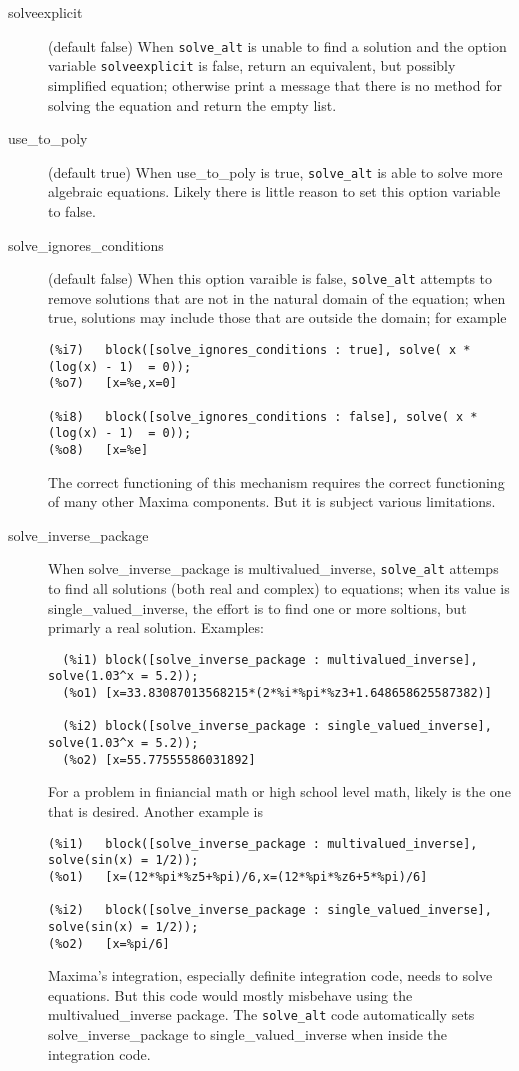 \documentclass[]{article}%
\newcommand{\altsolve}{\texttt{solve\_alt}}
\newcommand{\solveexplicit}{\texttt{solveexplicit}}
\begin{document}
\begin{description}


\item [solveexplicit] (default false) When \altsolve\/  is unable to find a solution and the option variable \solveexplicit\/ is false, return an equivalent, but possibly simplified equation;  otherwise print a message that there is no method for solving the equation and return the empty list.

\item [use\_to\_poly] (default true)  When use\_to\_poly is true, \altsolve\/ is able to solve more algebraic
equations.  Likely there is little reason to set this option variable to false.

\item[solve\_ignores\_conditions] (default false) When this option varaible is false, \altsolve\/ attempts to
remove solutions that are not in the natural domain of the equation; when true, solutions may include those that are outside the domain; for example
\begin{verbatim}
(%i7)	block([solve_ignores_conditions : true], solve( x * (log(x) - 1)  = 0));
(%o7)	[x=%e,x=0]

(%i8)	block([solve_ignores_conditions : false], solve( x * (log(x) - 1)  = 0));
(%o8)	[x=%e]
\end{verbatim}

The correct functioning of this mechanism requires the correct functioning of many other Maxima components. But it is subject various limitations.

\item[solve\_inverse\_package] When solve\_inverse\_package is multivalued\_inverse, \altsolve\/ attemps to find all solutions (both real and complex) to equations; when its value is single\_valued\_inverse, the effort is to find one or more soltions, but primarly a real solution. Examples:
\begin{verbatim}
  (%i1)	block([solve_inverse_package : multivalued_inverse], solve(1.03^x = 5.2));
  (%o1)	[x=33.83087013568215*(2*%i*%pi*%z3+1.648658625587382)]

  (%i2)	block([solve_inverse_package : single_valued_inverse], solve(1.03^x = 5.2));
  (%o2)	[x=55.77555586031892]
\end{verbatim}
For a problem in finiancial math or high school level math, likely is the one that is desired. Another
example is
\begin{verbatim}
(%i1)	block([solve_inverse_package : multivalued_inverse], solve(sin(x) = 1/2));
(%o1)	[x=(12*%pi*%z5+%pi)/6,x=(12*%pi*%z6+5*%pi)/6]

(%i2)	block([solve_inverse_package : single_valued_inverse], solve(sin(x) = 1/2));
(%o2)	[x=%pi/6]
\end{verbatim}

Maxima's integration, especially definite integration code, needs to solve equations. But this code would mostly misbehave using the  multivalued\_inverse package. The \altsolve\/ code automatically sets solve\_inverse\_package to single\_valued\_inverse when inside the integration code.

\end{description}
\end{document}
